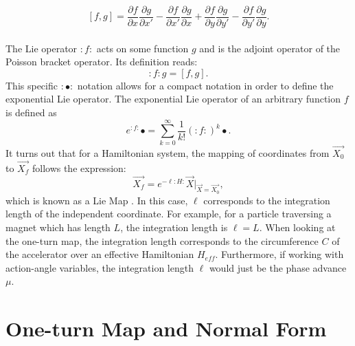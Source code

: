 \begin{equation}
    \label{eq:ch2poisson1}
    \left[ f,g \right] = \frac{\partial f}{\partial x}\frac{\partial g}{\partial x'} - \frac{\partial f}{\partial x'}\frac{\partial g}{\partial x} + \frac{\partial f}{\partial y}\frac{\partial g}{\partial y'} - \frac{\partial f}{\partial y'}\frac{\partial g}{\partial y}. 
\end{equation}\\
The Lie operator $:f:$ acts on some function $g$ and is the adjoint operator of the Poisson bracket operator. Its definition reads:
\begin{equation}
    \label{eq:ch2lie1}
    :f:g = \left[ f,g \right].
\end{equation}
This specific $:\bullet:$ notation allows for a compact notation in order to define the exponential Lie operator. The exponential Lie operator of an arbitrary function $f$ is defined as
\begin{equation}
    \label{eq:ch2explie1}
    e^{:f:}\bullet = \sum_{k=0}^{\infty}\frac{1}{k!}\left( :f: \right)^k \bullet.
\end{equation}
It turns out that for a Hamiltonian system, the mapping of coordinates from $\vec{X_0}$ to $\vec{X_f}$ follows the expression:
\begin{equation}
    \label{eq:ch2liemap1}
    \vec{X_f}=e^{-\ell :H:}\vec{X}\bigg\rvert_{\vec{X}=\vec{X_0}},
\end{equation}
which is known as a Lie Map \cite{todd1}. In this case, $\ell$ corresponds to the integration length of the independent coordinate. For example, for a particle traversing a magnet which has length $L$, the integration length is $\ell = L$. When looking at the one-turn map, the integration length corresponds to the circumference $C$ of the accelerator over an effective Hamiltonian $H_{eff}$. Furthermore, if working with action-angle variables, the integration length $\ell$ would just be the phase advance $\mu$.\\ 

\section{\label{sec:oneturn}One-turn Map and Normal Form}

